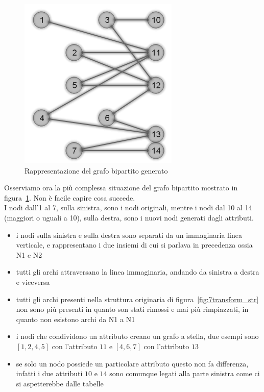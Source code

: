 %
\begin{figure}[htp]
	\centering
	\includegraphics{immagini/7transform_bipartite}
	\caption{Rappresentazione del grafo bipartito generato}
	\label{fig:7transform_bipartite}
\end{figure}
%
Osserviamo ora la più complessa situazione del grafo bipartito mostrato in figura~\ref{fig:7transform_bipartite}. Non è facile capire cosa succede.\\
I nodi dall'1 al 7, sulla sinistra, sono i nodi originali, mentre i nodi dal 10 al 14 (maggiori o uguali a 10), sulla destra, sono i nuovi nodi generati dagli attributi.
\begin{itemize}
	\item i nodi sulla sinistra e sulla destra sono separati da un immaginaria linea verticale, e rappresentano i due insiemi di cui si parlava in precedenza ossia N1 e N2
	\item tutti gli archi attraversano la linea immaginaria, andando da sinistra a destra e viceversa
	\item tutti gli archi presenti nella struttura originaria di figura~\ref{fig:7transform_str} non sono più presenti in quanto son stati rimossi e mai più rimpiazzati, in quanto non esistono archi da N1 a N1
	\item i nodi che condividono un attributo creano un grafo a stella, due esempi sono $[1,2,4,5]$ con l'attributo $11$ e $[4,6,7]$ con l'attributo $13$
	\item se solo un nodo possiede un particolare attributo questo non fa differenza, infatti i due attributi $10$ e $14$ sono comunque legati alla parte sinistra come ci si aspetterebbe dalle tabelle
\end{itemize}
%
%
%
